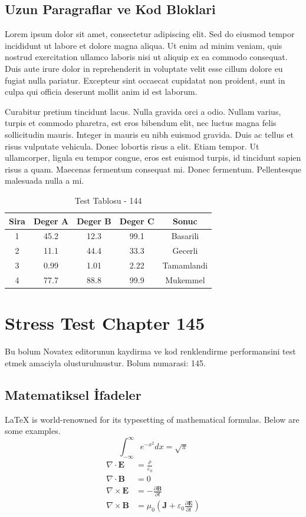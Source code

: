 \documentclass[12pt,a4paper]{article}
\begin{document}
\subsection{Uzun Paragraflar ve Kod Bloklari}
Lorem ipsum dolor sit amet, consectetur adipiscing elit. Sed do eiusmod tempor incididunt ut labore et dolore magna aliqua. Ut enim ad minim veniam, quis nostrud exercitation ullamco laboris nisi ut aliquip ex ea commodo consequat. Duis aute irure dolor in reprehenderit in voluptate velit esse cillum dolore eu fugiat nulla pariatur. Excepteur sint occaecat cupidatat non proident, sunt in culpa qui officia deserunt mollit anim id est laborum.

Curabitur pretium tincidunt lacus. Nulla gravida orci a odio. Nullam varius, turpis et commodo pharetra, est eros bibendum elit, nec luctus magna felis sollicitudin mauris. Integer in mauris eu nibh euismod gravida. Duis ac tellus et risus vulputate vehicula. Donec lobortis risus a elit. Etiam tempor. Ut ullamcorper, ligula eu tempor congue, eros est euismod turpis, id tincidunt sapien risus a quam. Maecenas fermentum consequat mi. Donec fermentum. Pellentesque malesuada nulla a mi.

\begin{table}[h!]
\centering
\begin{tabular}{|c|c|c|c|c|}
\hline
\textbf{Sira} & \textbf{Deger A} & \textbf{Deger B} & \textbf{Deger C} & \textbf{Sonuc} \\
\hline
1 & 45.2 & 12.3 & 99.1 & Basarili \\
2 & 11.1 & 44.4 & 33.3 & Gecerli \\
3 & 0.99 & 1.01 & 2.22 & Tamamlandi \\
4 & 77.7 & 88.8 & 99.9 & Mukemmel \\
\hline
\end{tabular}
\caption{Test Tablosu - 144}
\end{table}

\newpage
\section{Stress Test Chapter 145}
Bu bolum Novatex editorunun kaydirma ve kod renklendirme performansini test etmek amaciyla olusturulmustur. Bolum numarasi: 145.

\subsection{Matematiksel İfadeler}
\LaTeX{} is world-renowned for its typesetting of mathematical formulas. Below are some examples.
\begin{equation}
\int_{-\infty}^{\infty} e^{-x^2} dx = \sqrt{\pi}
\end{equation}
\begin{align}
\nabla \cdot \mathbf{E} &= \frac{\rho}{\varepsilon_0} \\
\nabla \cdot \mathbf{B} &= 0 \\
\nabla \times \mathbf{E} &= -\frac{\partial \mathbf{B}}{\partial t} \\
\nabla \times \mathbf{B} &= \mu_0\left(\mathbf{J} + \varepsilon_0 \frac{\partial \mathbf{E}}{\partial t}\right)
\end{align}
\end{document}
